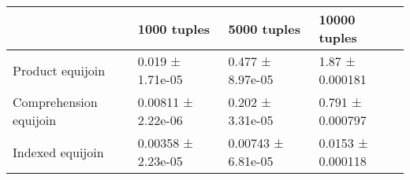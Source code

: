 \begin{tabular}{llll}
\toprule
 & 1000 tuples & 5000 tuples & 10000 tuples \\
\midrule
Product equijoin & 0.019 ± 1.71e-05 & 0.477 ± 8.97e-05 & 1.87 ± 0.000181 \\
Comprehension equijoin & 0.00811 ± 2.22e-06 & 0.202 ± 3.31e-05 & 0.791 ± 0.000797 \\
Indexed equijoin & 0.00358 ± 2.23e-05 & 0.00743 ± 6.81e-05 & 0.0153 ± 0.000118 \\
\bottomrule
\end{tabular}

